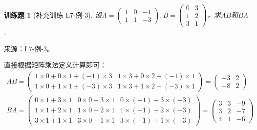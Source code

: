 \documentclass[UTF8,12pt,a4paper,fontset=fandol]{ctexart}
\newtheorem{exercise}{训练题}[section]
\begin{document}
\begin{exercise}[补充训练 L7-例-3]\label{prob:L7-例-3}
设$A=\begin{pmatrix}
            1 & 0 & -1 \\
            1 & 1 & -3
        \end{pmatrix}, B=\begin{pmatrix}
            0 & 3 \\
            1 & 2 \\
            3 & 1
        \end{pmatrix}$，求$AB$和$BA$.
\end{exercise}
\noindent 来源：\href{https://github.com/yhwu-is/Linear-Algebra-Left-Undone/blob/new/%E8%AE%B2%E4%B9%89/%E4%B8%93%E9%A2%98/7%20%E7%BA%BF%E6%80%A7%E6%98%A0%E5%B0%84%E7%9F%A9%E9%98%B5%E8%A1%A8%E7%A4%BA%E4%B8%8E%E7%9F%A9%E9%98%B5%E8%BF%90%E7%AE%97%E5%9F%BA%E7%A1%80.tex}{L7-例-3}。
\begin{solve}
直接根据矩阵乘法定义计算即可：
    \begin{gather*}
        AB = \begin{pmatrix}
            1 \times 0 + 0 \times 1 + (-1) \times 3 & 1 \times 3 + 0 \times 2 + (-1) \times 1 \\
            1 \times 0 + 1 \times 1 + (-3) \times 3 & 1 \times 3 + 1 \times 2 + (-3) \times 1
        \end{pmatrix} = \begin{pmatrix}
                -3 & 2 \\
                -8 & 2
            \end{pmatrix} \\
        BA = \begin{pmatrix}
            0 \times 1 + 3 \times 1 & 0 \times 0 + 3 \times 1 & 0 \times (-1) + 3 \times (-3) \\
            1 \times 1 + 2 \times 1 & 1 \times 0 + 2 \times 1 & 1 \times (-1) + 2 \times (-3) \\
            3 \times 1 + 1 \times 1 & 3 \times 0 + 1 \times 1 & 3 \times (-1) + 1 \times (-3)
        \end{pmatrix} = \begin{pmatrix}
                3 & 3 & -9 \\
                3 & 2 & -7 \\
                4 & 1 & -6
            \end{pmatrix}
    \end{gather*}
\end{solve}
\end{document}
